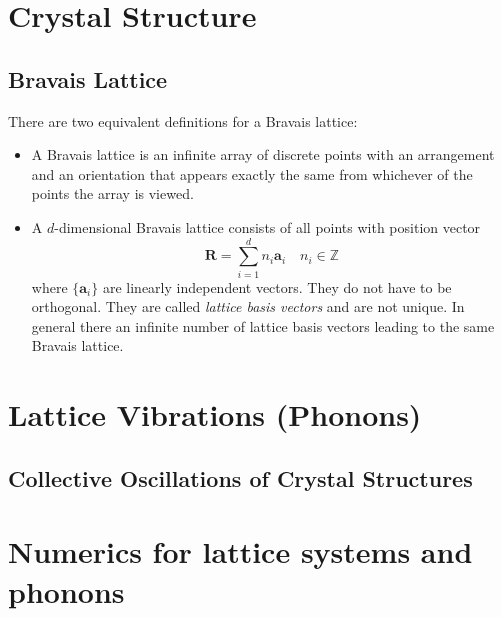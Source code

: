 \documentclass[11pt]{book}
\renewcommand{\vec}[1]{\bm{#1}}
\begin{document}
\clearpage
\newpage
\chapter{Crystal Structure}\label{chapter2}



\section{Bravais Lattice}\label{section2}
There are two equivalent definitions for a Bravais lattice:
\begin{itemize}
  \item A Bravais lattice is an infinite array of discrete points with an arrangement and an orientation that appears exactly the same from whichever of the points the array is viewed.
  \item A $d$-dimensional Bravais lattice consists of all points with position vector 
    \begin{equation}
      \vec{R} = \sum_{i=1}^{d} n_i \vec{a}_i\quad n_i \in \mathbb{Z}
    \end{equation}
      where $\{\vec{a}_i\}$ are linearly independent vectors. They do not have to be orthogonal. They are called \textit{lattice basis vectors} and are not unique. In general there an infinite number of lattice basis vectors leading to the same Bravais lattice.
\end{itemize}


\clearpage
\newpage

\chapter{Lattice Vibrations (Phonons)}\label{chapter3}

\clearpage
\newpage

\section{Collective Oscillations of Crystal Structures}


\clearpage
\newpage

\chapter{Numerics for lattice systems and phonons}
\end{document}
